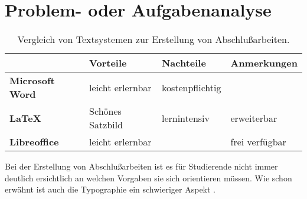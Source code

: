 \documentclass[12pt,        %
  english,ngerman,          %
  paper=a4,                 %
  captions=tablesignature,  %
  listof=numbered,          %
  bibliography=totoc,       %
  headings=small,           %
  headinclude=false,        %
  footinclude=false,        %
  parskip=half-,            %
  oneside,                  %
  BCOR=5mm,                 %
  DIV=12                    %
  ]{scrbook}                %
\begin{document}
\section{Problem- oder Aufgabenanalyse}\label{sec:problem_ana}


\begin{table}[ht]
  \renewcommand{\tabcolsep}{3mm}
  \renewcommand{\arraystretch}{1.5}
  \begin{center}
    \begin{tabular}{llll}
                              & \textbf{Vorteile}  & \textbf{Nachteile} & \textbf{Anmerkungen}\\
      \hline
      \textbf{Microsoft Word} & leicht erlernbar   & kostenpflichtig    & \\
      \textbf{\LaTeX}         & Schönes Satzbild   & lernintensiv       & erweiterbar \\
      \textbf{Libreoffice}    & leicht erlernbar   &                    & frei verfügbar \\
    \end{tabular}
    \caption{Vergleich von Textsystemen zur Erstellung von Abschlußarbeiten.}
    \label{table:typesetting}
  \end{center}
\end{table}%

Bei der Erstellung von Abschlußarbeiten ist es für Studierende nicht immer deutlich ersichtlich
an welchen Vorgaben sie sich orientieren müssen. Wie schon \citet[Seite 19]{bringhurst-2005-elements_typographic_style} erwähnt ist auch die Typographie ein schwieriger Aspekt \citep{willberg-2008-wegweiser_schrift}.
\end{document}
